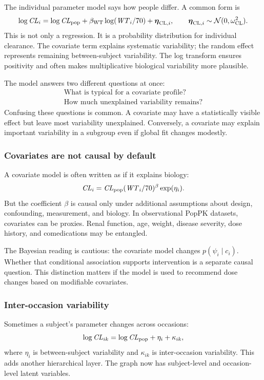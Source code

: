 The individual parameter model says how people differ.  A common form is
\[
  \log \pksym{CL}_i
  =
  \log \pksym{CL}_{\pop}
  +\beta_{\pklab{WT}}\log(\pksym{WT}_i/70)
  +\reta_{\pklab{CL},i},
  \qquad
  \reta_{\pklab{CL},i}\sim\Normal(0,\omega_{\pklab{CL}}^2).
\]
This is not only a regression.  It is a probability distribution for individual clearance.  The covariate term explains systematic variability; the random effect represents remaining between-subject variability.  The log transform ensures positivity and often makes multiplicative biological variability more plausible.

The model answers two different questions at once:
\[
  \begin{array}{c}
    \text{What is typical for a covariate profile?}\\
    \text{How much unexplained variability remains?}
  \end{array}
\]
Confusing these questions is common.  A covariate may have a statistically visible effect but leave most variability unexplained.  Conversely, a covariate may explain important variability in a subgroup even if global fit changes modestly.

\subsubsection*{Covariates are not causal by default}

A covariate model is often written as if it explains biology:
\[
  \pksym{CL}_i=\pksym{CL}_{\pop}(\pksym{WT}_i/70)^{\beta}\exp(\eta_i).
\]
But the coefficient \(\beta\) is causal only under additional assumptions about design, confounding, measurement, and biology.  In observational PopPK datasets, covariates can be proxies.  Renal function, age, weight, disease severity, dose history, and comedications may be entangled.

The Bayesian reading is cautious: the covariate model changes \(p(\psi_i\mid c_i)\).  Whether that conditional association supports intervention is a separate causal question.  This distinction matters if the model is used to recommend dose changes based on modifiable covariates.

\subsubsection*{Inter-occasion variability}

Sometimes a subject's parameter changes across occasions:
\[
  \log \pksym{CL}_{ik}
  =
  \log \pksym{CL}_{\pop}
  +\eta_{i}
  +\kappa_{ik},
\]
where \(\eta_i\) is between-subject variability and \(\kappa_{ik}\) is inter-occasion variability.  This adds another hierarchical layer.  The graph now has subject-level and occasion-level latent variables.

